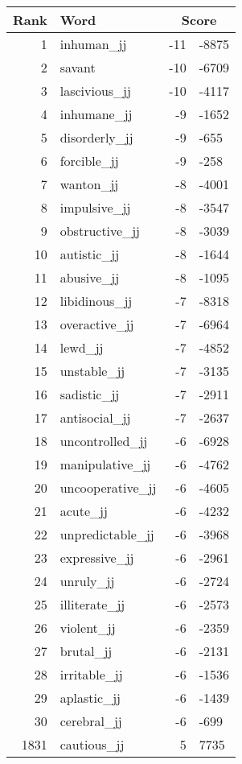 \begin{longtable}[!htbp]{| rlr@{.}l |}
    \hline
    \textbf{Rank} & \textbf{Word} & \multicolumn{2}{c|}{\textbf{Score}} \\
    \hline
    \endhead
    1 & inhuman\_jj & -11 & -8875 \\
    2 & savant & -10 & -6709 \\
    3 & lascivious\_jj & -10 & -4117 \\
    4 & inhumane\_jj & -9 & -1652 \\
    5 & disorderly\_jj & -9 & -655 \\
    6 & forcible\_jj & -9 & -258 \\
    7 & wanton\_jj & -8 & -4001 \\
    8 & impulsive\_jj & -8 & -3547 \\
    9 & obstructive\_jj & -8 & -3039 \\
    10 & autistic\_jj & -8 & -1644 \\
    11 & abusive\_jj & -8 & -1095 \\
    12 & libidinous\_jj & -7 & -8318 \\
    13 & overactive\_jj & -7 & -6964 \\
    14 & lewd\_jj & -7 & -4852 \\
    15 & unstable\_jj & -7 & -3135 \\
    16 & sadistic\_jj & -7 & -2911 \\
    17 & antisocial\_jj & -7 & -2637 \\
    18 & uncontrolled\_jj & -6 & -6928 \\
    19 & manipulative\_jj & -6 & -4762 \\
    20 & uncooperative\_jj & -6 & -4605 \\
    21 & acute\_jj & -6 & -4232 \\
    22 & unpredictable\_jj & -6 & -3968 \\
    23 & expressive\_jj & -6 & -2961 \\
    24 & unruly\_jj & -6 & -2724 \\
    25 & illiterate\_jj & -6 & -2573 \\
    26 & violent\_jj & -6 & -2359 \\
    27 & brutal\_jj & -6 & -2131 \\
    28 & irritable\_jj & -6 & -1536 \\
    29 & aplastic\_jj & -6 & -1439 \\
    30 & cerebral\_jj & -6 & -699 \\
    1831 & cautious\_jj & 5 & 7735 \\

\end{longtable}

